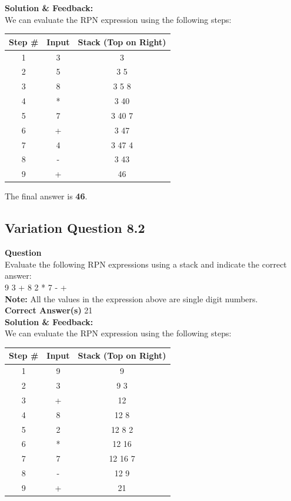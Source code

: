 \noindent \textbf{Solution \& Feedback:}\\
\noindent We can evaluate the RPN expression using the following steps:\\

\begin{tabular}{|c|c|c|}
\hline
\textbf{Step \#} & \textbf{Input} & \textbf{Stack (Top on Right)} \\
\hline
1 & 3 & 3 \\
\hline
2 & 5 & 3 5 \\
\hline
3 & 8 & 3 5 8 \\
\hline
4 & * & 3 40 \\
\hline
5 & 7 & 3 40 7 \\
\hline
6 & + & 3 47 \\
\hline
7 & 4 & 3 47 4 \\
\hline
8 & - & 3 43 \\
\hline
9 & + & 46 \\
\hline
\end{tabular}

\noindent The final answer is \textbf{46}.

\subsection{Variation Question 8.2}
\textbf{Question} \\
Evaluate the following RPN expressions using a stack and indicate the correct answer:\\
9 3 + 8 2 * 7 - + \\
\textbf{Note:} All the values in the expression above are single digit numbers. \\ 
\textbf{Correct Answer(s)} 21 \\
\textbf{Solution \& Feedback:} \\
We can evaluate the RPN expression using the following steps: \\
\begin{tabular}{|c|c|c|}
\hline
\textbf{Step \#} & \textbf{Input} & \textbf{Stack (Top on Right)} \\ \hline
1 & 9 & 9 \\ \hline
2 & 3 & 9 3 \\ \hline
3 & + & 12 \\ \hline
4 & 8 & 12 8 \\ \hline
5 & 2 & 12 8 2 \\ \hline
6 & * & 12 16 \\ \hline
7 & 7 & 12 16 7 \\ \hline
8 & - & 12 9 \\ \hline
9 & + & 21 \\ \hline
\end{tabular}

